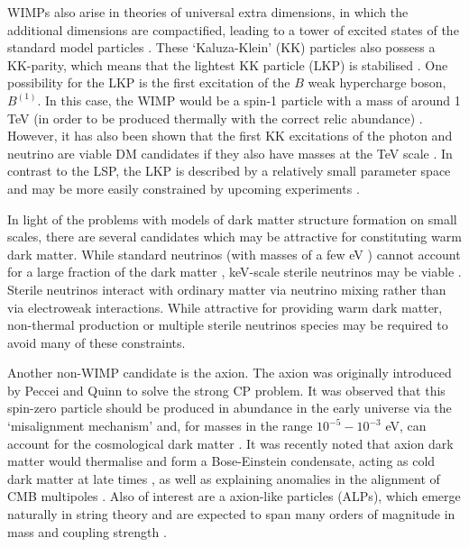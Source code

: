 WIMPs also arise in theories of universal extra dimensions, in which the additional dimensions are compactified, leading to a tower of excited states of the standard model particles \cite{Duff:1994}. These `Kaluza-Klein' (KK) particles also possess a KK-parity, which means that the lightest KK particle (LKP) is stabilised \cite{Appelquist:2001}. One possibility for the LKP is the first excitation of the $B$ weak hypercharge boson, $B^{(1)}$. In this case, the WIMP would be a spin-1 particle with a mass of around 1 TeV (in order to be produced thermally with the correct relic abundance) \cite{Cheng:2002}. However, it has also been shown that the first KK excitations of the photon and neutrino are viable DM candidates if they also have masses at the TeV scale \cite{Servant:2002}. In contrast to the LSP, the LKP is described by a relatively small parameter space and may be more easily constrained by upcoming experiments \cite{Bergstrom:2009}.

In light of the problems with models of dark matter structure formation on small scales, there are several candidates which may be attractive for constituting warm dark matter. While standard neutrinos (with masses of a few eV \cite{Amsler:2008}) cannot account for a large fraction of the dark matter , keV-scale sterile neutrinos may be viable \cite{Dodelson:1994}. Sterile neutrinos interact with ordinary matter via neutrino mixing rather than via electroweak interactions.  While attractive for providing warm dark matter, non-thermal production \cite{Shi:1999} or multiple sterile neutrinos species \cite{Asaka:2006} may be required to avoid many of these constraints.

Another non-WIMP candidate is the axion. The axion was originally introduced by Peccei and Quinn \cite{Peccei:1977} to solve the strong CP problem. It was observed that this spin-zero particle should be produced in abundance in the early universe via the `misalignment mechanism' and, for masses in the range $10^{-5} - 10^{-3}$ eV, can account for the cosmological dark matter \cite{Raffelt:1995}.  It was recently noted that axion dark matter would thermalise and form a Bose-Einstein condensate, acting as cold dark matter at late times \cite{Sikivie:2009}, as well as explaining anomalies in the alignment of CMB multipoles \cite{Copi:2010}. Also of interest are a axion-like particles (ALPs), which emerge naturally in string theory and are expected to span many orders of magnitude in mass and coupling strength \cite{Arvanitaki:2009}. 

